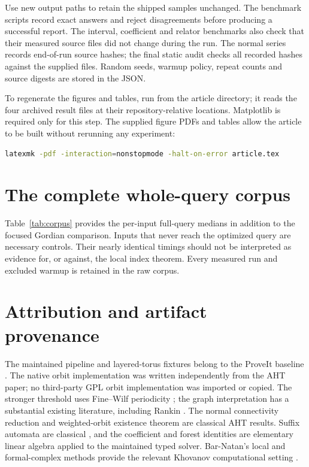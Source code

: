 Use new output paths to retain the shipped samples unchanged. The
benchmark scripts record exact answers and reject disagreements before
producing a successful report. The interval, coefficient and relator benchmarks also check that
their measured source files did not change during the run. The normal
series records end-of-run source hashes; the final static audit checks
all recorded hashes against the supplied files. Random seeds,
warmup policy, repeat counts and source digests are stored in the JSON.

To regenerate the figures and tables, run  from
the article directory; it reads the four archived result files at their
repository-relative locations. Matplotlib is required only for this step.
The supplied figure PDFs and tables allow the article to be built without
rerunning any experiment:

\noindent\begin{minipage}{\linewidth}
\begin{lstlisting}[language=bash]
latexmk -pdf -interaction=nonstopmode -halt-on-error article.tex
\end{lstlisting}
\end{minipage}

\section{The complete whole-query corpus}

Table~\ref{tab:corpus} provides the per-input full-query medians in addition
to the focused Gordian comparison. Inputs that never reach the optimized
query are necessary controls. Their nearly identical timings should not
be interpreted as evidence for, or against, the local index theorem.
Every measured run and excluded warmup is retained in the raw corpus.



\section{Attribution and artifact provenance}

The maintained pipeline and layered-torus fixtures belong to the ProveIt
baseline \cite{repository}. The native orbit implementation was written
independently from the AHT paper; no third-party GPL orbit implementation
was imported or copied. The stronger threshold uses Fine--Wilf periodicity
\cite{finewilf}; the graph interpretation has a substantial existing
literature, including Rankin \cite{rankin}. The normal connectivity
reduction and weighted-orbit existence theorem are classical AHT results.
Suffix automata are classical \cite{blumer}, and the coefficient and forest
identities are elementary linear algebra applied to the maintained typed
solver. Bar-Natan's local and formal-complex methods provide the relevant
Khovanov computational setting \cite{barnatan,barnatancob}.

